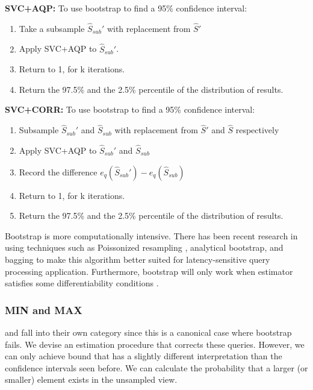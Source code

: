 \noindent\textbf{SVC+AQP: } To use bootstrap to find a 95\% confidence interval:
\begin{enumerate}[noitemsep]
\item Take a subsample $\widehat{S}_{sub}'$ with replacement from $\widehat{S}'$
\item Apply SVC+AQP to $\widehat{S}_{sub}'$.
\item Return to 1, for k iterations.
\item Return the 97.5\% and the 2.5\% percentile of the distribution of results.
\end{enumerate}

\noindent\textbf{SVC+CORR: } To use bootstrap to find a 95\% confidence interval:
\begin{enumerate}[noitemsep]
\item Subsample $\widehat{S}_{sub}'$ and $\widehat{S}_{sub}$ with replacement from $\widehat{S}'$ and $\widehat{S}$ respectively
\item Apply SVC+AQP to $\widehat{S}_{sub}'$ and $\widehat{S}_{sub}$
\item Record the difference $e_q(\widehat{S}_{sub}')-e_q(\widehat{S}_{sub})$ 
\item Return to 1, for k iterations.
\item Return the 97.5\% and the 2.5\% percentile of the distribution of results.
\end{enumerate}

Bootstrap is more computationally intensive.
There has been recent research in using techniques such as Poissonized resampling \cite{agarwalknowing}, analytical bootstrap\cite{DBLP:conf/sigmod/ZengGMZ14}, and bagging \cite{DBLP:conf/kdd/KleinerTASJ13} to make this algorithm better suited for latency-sensitive query processing application.
Furthermore, bootstrap will only work when estimator satisfies some differentiability conditions \cite{agarwalknowing}.

\subsubsection{MIN and MAX}
\minfunc and \maxfunc fall into their own category since this is a canonical case where bootstrap fails.
We devise an estimation procedure that corrects these queries.
However, we can only achieve bound that has a slightly different interpretation than the confidence intervals seen before.
We can calculate the probability that a larger (or smaller) element exists in the unsampled view.

